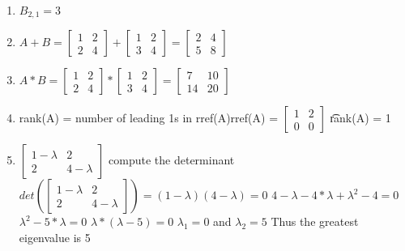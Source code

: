 \documentclass{article}
\begin{document}
	\begin{enumerate}
		\item $B_{2,1} = 3$
		
		\item $A + B = \begin{bmatrix} 1 & 2 \\ 2 & 4 \end{bmatrix} + \begin{bmatrix} 1 & 2 \\ 3 & 4 \end{bmatrix} = \begin{bmatrix} 2 & 4 \\ 5 & 8 \end{bmatrix}$ 
		\item $A*B = \begin{bmatrix} 1 & 2 \\ 2 & 4 \end{bmatrix} * \begin{bmatrix} 1 & 2 \\ 3 & 4 \end{bmatrix} = \begin{bmatrix} 7 & 10 \\ 14 & 20 \end{bmatrix}$
		\item rank(A) = number of leading 1s in rref(A)\newline rref(A) = $\begin{bmatrix}
		1 & 2 \\ 0 & 0
		\end{bmatrix}$ \t
		rank(A) = 1
		\item $\begin{bmatrix}
		1-\lambda & 2 \\ 2 & 4-\lambda
		\end{bmatrix}
		$
		\newline compute the determinant \newline
		$det(\begin{bmatrix}
			1-\lambda & 2 \\ 2 & 4-\lambda
		\end{bmatrix}) = (1-\lambda)(4-\lambda) = 0$
		\newline
		$4 - \lambda - 4*\lambda + \lambda^{2}-4 = 0$ \newline
		$\lambda^{2} -5*\lambda = 0$ \newline
		$\lambda*(\lambda-5) = 0$ \newline
		$\lambda_{1} = 0$  and  $\lambda_{2} = 5 $ Thus the greatest eigenvalue is 5
		

\end{enumerate}
\end{document}
